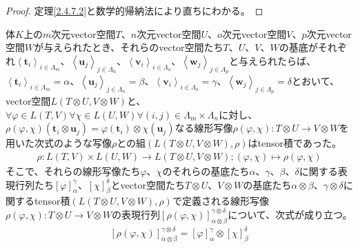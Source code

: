 \documentclass[dvipdfmx]{jsarticle}
\begin{document}
\begin{proof} 定理\ref{2.4.7.2}と数学的帰納法により直ちにわかる。
\end{proof}
\begin{thm}\label{2.4.7.4}
体$K$上の$m$次元vector空間$T$、$n$次元vector空間$U$、$o$次元vector空間$V$、$p$次元vector空間$W$が与えられたとき、それらのvector空間たち$T$、$U$、$V$、$W$の基底がそれぞれ$\left\langle \mathbf{t}_{i} \right\rangle_{i \in \varLambda_{m}}$、$\left\langle \mathbf{u}_{j} \right\rangle_{j \in \varLambda_{n}}$、$\left\langle \mathbf{v}_{i} \right\rangle_{i \in \varLambda_{o}}$、$\left\langle \mathbf{w}_{j} \right\rangle_{j \in \varLambda_{p}}$と与えられたらば、$\left\langle \mathbf{t}_{i} \right\rangle_{i \in \varLambda_{m}} = \alpha$、$\left\langle \mathbf{u}_{j} \right\rangle_{j \in \varLambda_{n}} = \beta$、$\left\langle \mathbf{v}_{i} \right\rangle_{i \in \varLambda_{o}} = \gamma$、$\left\langle \mathbf{w}_{j} \right\rangle_{j \in \varLambda_{p}} = \delta$とおいて、vector空間$L(T \otimes U,V \otimes W)$と、$\forall\varphi \in L(T,V)\forall\chi \in L(U,W)\forall(i,j) \in \varLambda_{m} \times \varLambda_{n}$に対し、$\rho(\varphi,\chi)\left( \mathbf{t}_{i} \otimes \mathbf{u}_{j} \right) = \varphi\left( \mathbf{t}_{i} \right) \otimes \chi\left( \mathbf{u}_{j} \right)$なる線形写像$\rho(\varphi,\chi):T \otimes U \rightarrow V \otimes W$を用いた次式のような写像$\rho$との組$\left( L(T \otimes U,V \otimes W),\rho \right)$はtensor積であった。
\begin{align*}
\rho:L(T,V) \times L(U,W) \rightarrow L(T \otimes U,V \otimes W);(\varphi,\chi) \mapsto \rho(\varphi,\chi)
\end{align*}
そこで、それらの線形写像たち$\varphi$、$\chi$のそれらの基底たち$\alpha$、$\gamma$、$\beta$、$\delta$に関する表現行列たち$[\varphi]^{\gamma}_{\alpha}$、$[\chi]^{\delta}_{\beta}$とvector空間たち$T \otimes U$、$V \otimes W$の基底たち$\alpha \otimes \beta$、$\gamma \otimes \delta$に関するtensor積$\left( L(T \otimes U,V \otimes W),\rho \right)$で定義される線形写像$\rho(\varphi,\chi):T \otimes U \rightarrow V \otimes W$の表現行列$\left[ \rho(\varphi,\chi) \right]^{\gamma \otimes \delta}_{\alpha \otimes \beta}$について、次式が成り立つ。
\begin{align*}
\left[ \rho(\varphi,\chi) \right]^{\gamma \otimes \delta}_{\alpha \otimes \beta} = [\varphi]^{\gamma}_{\alpha} \otimes [\chi]^{\delta}_{\beta}
\end{align*}
\end{thm}
\end{document}
